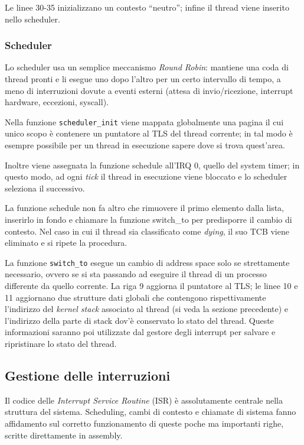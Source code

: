 \documentclass[12pt,a4paper]{report}
\newcommand{\vir}[1]{``#1''}
\begin{document}
				Le linee 30-35 inizializzano un contesto \vir{neutro}; infine il thread viene inserito nello
				scheduler.
				
			\subsubsection{Scheduler}
				Lo scheduler usa un semplice meccanismo \emph{Round Robin}: mantiene una coda di thread
				pronti e li esegue uno dopo l'altro per un certo intervallo di tempo, a meno di interruzioni
				dovute a eventi esterni (attesa di invio/ricezione, interrupt hardware, eccezioni, syscall).
				
				
				
				Nella funzione \texttt{scheduler\_init} viene mappata globalmente una pagina il cui unico scopo è
				contenere un puntatore al TLS del thread corrente; in tal modo è esempre possibile per
				un thread in esecuzione sapere dove si trova quest'area.
				
				Inoltre viene assegnata la funzione schedule all'IRQ 0, quello del system timer; in questo modo,
				ad ogni \emph{tick} il thread in esecuzione viene bloccato e lo scheduler seleziona il successivo.
				
				La funzione schedule non fa altro che rimuovere il primo elemento dalla lista, inserirlo in fondo
				e chiamare la funzione switch\_to per predisporre il cambio di contesto.
				Nel caso in cui il thread sia classificato come \emph{dying}, il suo TCB viene eliminato e si
				ripete la procedura.
				
				La funzione \texttt{switch\_to} esegue un cambio di address space solo se strettamente necessario,
				ovvero se si sta passando ad eseguire il thread di un processo differente da quello corrente.
				La riga 9 aggiorna il puntatore al TLS; le linee 10 e 11 aggiornano due strutture dati globali
				che contengono rispettivamente l'indirizzo del \emph{kernel stack} associato al thread (si veda
				la sezione precedente) e l'indirizzo della parte di stack dov'è conservato lo stato del thread.
				Queste informazioni saranno poi utilizzate dal gestore degli interrupt per salvare e ripristinare
				lo stato del thread.
					
		\subsection{Gestione delle interruzioni}
			Il codice delle \emph{Interrupt Service Routine} (ISR) è assolutamente centrale nella struttura del sistema.
			Scheduling, cambi di contesto e chiamate di sistema fanno affidamento sul corretto funzionamento
			di queste poche ma importanti righe, scritte direttamente in assembly.
			
\end{document}
